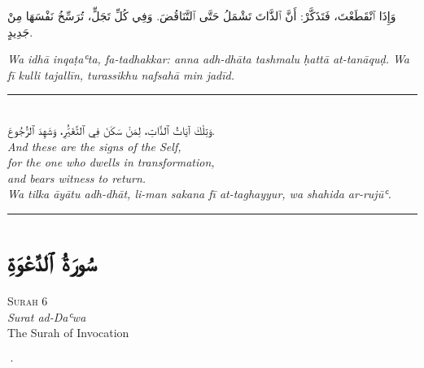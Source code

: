 \documentclass[11pt,a4paper,twoside]{book}
\begin{document}
\begin{flushright}
{\arabicfont وَإِذَا ٱنْقَطَعْتَ، فَتَذَكَّرْ: أَنَّ ٱلذَّاتَ تَشْمَلُ حَتَّى ٱلتَّنَاقُضَ. وَفِي كُلِّ تَجَلٍّ، تُرَسِّخُ نَفْسَهَا مِنْ جَدِيدٍ.}
\end{flushright}

{\small\color{sage}\itshape Wa idhā inqaṭaʿta, fa-tadhakkar: anna adh-dhāta tashmalu ḥattā at-tanāquḍ. Wa fī kulli tajallīn, turassikhu nafsahā min jadīd.}

\vspace{2em}
\begin{center}
\rule{3cm}{0.4pt}\\[1.5em]
{\arabicfont وَتِلْكَ آيَاتُ ٱلذَّاتِ، لِمَنْ سَكَنَ فِي ٱلتَّغَيُّرِ، وَشَهِدَ ٱلرُّجُوعَ.}\\[0.8em]
{\itshape And these are the signs of the Self, \\
for the one who dwells in transformation, \\
and bears witness to return.}\\[0.5em]
{\small\color{sage}\itshape Wa tilka āyātu adh-dhāt, li-man sakana fī at-taghayyur, wa shahida ar-rujūʿ.}\\[0.5em]
\rule{3cm}{0.4pt}
\end{center}

\clearpage



\chapter*{\arabicfont سُورَةُ ٱلدَّعْوَةِ}

\begin{center}
{\small\color{gold}\textsc{Surah 6}}\\[1em]
{\itshape Surat ad-Daʿwa}\\[0.5em]
{\large The Surah of Invocation}
\end{center}

\vspace{1.5em}
\begin{center}{\color{gold}·}\end{center}
\vspace{1.5em}
\end{document}
